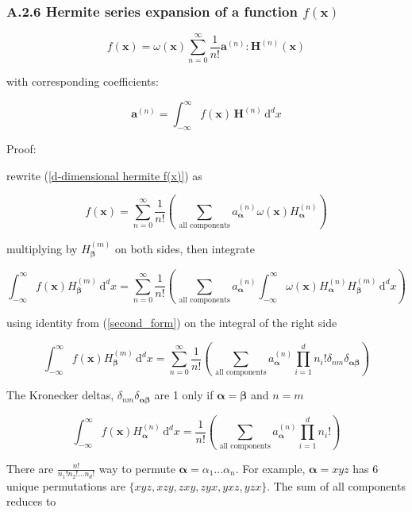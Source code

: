 \documentclass[draft]{article}
\begin{document}
\vspace*{0.5cm}
\subsubsection*{\large A.2.6 Hermite series expansion of a function $f(\bm{x})$}

\begin{equation}
	f(\bm{x}) = \omega(\bm{x}) \sum_{n=0}^{\infty} \frac{1}{n!} \bm{a}^{(n)}:\bm{H}^{(n)}(\bm{x}) \label{d-dimensional hermite f(x)}
\end{equation}

with corresponding coefficients:

\begin{equation}
	\bm{a}^{(n)} = \int_{-\infty}^{\infty} f(\bm{x}) \, \bm{H}^{(n)} \, \text{d}^d x
\end{equation}

Proof:

rewrite (\ref{d-dimensional hermite f(x)}) as

$$
f(\bm{x}) = \sum_{n=0}^{\infty} \frac{1}{n!} \left ( \, \sum_{\text{all components}} a^{(n)}_{\bm{\alpha}} \omega(\bm{x}) H^{(n)}_{\bm{\alpha}} \right )
$$

multiplying by $H^{(m)}_{\bm{\beta}}$ on both sides, then integrate 

$$
\int_{-\infty}^{\infty} f(\bm{x}) H^{(m)}_{\bm{\beta}} \, \text{d}^d x =  \sum_{n=0}^{\infty} \frac{1}{n!} \left ( \, \sum_{\text{all components}} a^{(n)}_{\bm{\alpha}} \int_{-\infty}^{\infty} \omega(\bm{x}) H^{(n)}_{\bm{\alpha}} H^{(m)}_{\bm{\beta}} \, \text{d}^d x \right )
$$

using identity from (\ref{second_form}) on the integral of the right side

$$
\int_{-\infty}^{\infty} f(\bm{x}) H^{(m)}_{\bm{\beta}} \, \text{d}^d x = \sum_{n=0}^{\infty} \frac{1}{n!} \left ( \, \sum_{\text{all components}} a^{(n)}_{\bm{\alpha}} \prod_{i=1}^{d} n_i! \delta_{nm} \delta_{\bm{\alpha} \bm{\beta}} \right )
$$

The Kronecker deltas, $\delta_{nm} \delta_{\bm{\alpha} \bm{\beta}}$ are 1 only if $\bm{\alpha} = \bm{\beta}$ and $n=m$

$$
\int_{-\infty}^{\infty} f(\bm{x}) H^{(n)}_{\bm{\alpha}} \, \text{d}^d x = \frac{1}{n!} \left ( \, \sum_{\text{all components}} a^{(n)}_{\bm{\alpha}} \prod_{i=1}^{d} n_i! \right )
$$

There are $\frac{n!}{n_1!n_2! \dots n_d!}$ way to permute $\bm{\alpha} = \alpha_1 \dots \alpha_n$. For example, $\bm{\alpha} = xyz$ has 6 unique permutations are $\{ xyz, xzy, zxy, zyx, yxz, yzx\}$. The sum of all components reduces to
\end{document}

